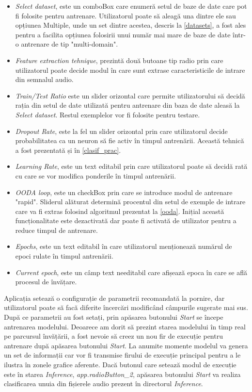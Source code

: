 \documentclass[a4paper,12pt]{book}
\begin{document}
		\begin{itemize}
			\setlength{\leftmargin}{-4cm}
			\item \textit{Select dataset}, este un comboBox care enumeră setul de baze de date care pot fi folosite pentru antrenare. Utilizatorul poate să aleagă una dintre ele sau opțiunea Multiple, unde un set dintre acestea, descris la \ref{datasets}, a fost ales pentru a facilita opțiunea folosirii unui număr mai mare de baze de date într-o antrenare de tip "multi-domain".
			\item \textit{Feature extraction tehnique}, prezintă două butoane tip radio prin care utilizatorul poate decide modul în care sunt extrase caracteristicile de intrare din semnalul audio. 
			\item \textit{Train/Test Ratio} este un slider orizontal care permite utilizatorului să decidă rația din setul de date utilizată pentru antrenare din baza de date aleasă la \textit{Select dataset}. Restul exemplelor vor fi folosite pentru testare. 
			\item \textit{Dropout Rate}, este la fel un slider orizontal prin care utilizatorul decide probabilitatea ca un neuron să fie activ în timpul antrenării. Această tehnică a fost prezentată și în \ref{clasif_prac}. 
			\item \textit{Learning Rate}, este un text editabil prin care utilizatorul poate să decidă rată cu care se vor modifica ponderile în timpul antrenării. 
			\item \textit{OODA loop}, este un checkBox prin care se introduce modul de antrenare "rapid". Sliderul alăturat determină procentul din setul de exemple de intrare care va fi extras folosind algoritmul prezentat la \ref{ooda}. Inițial această funcționalitate este dezactivată dar poate fi activată de utilizator pentru a reduce timpul de antrenare. 
			\item \textit{Epochs}, este un text editabil în care utilizatorul menționează numărul de epoci rulate în timpul antrenării.
			\item \textit{Current epoch}, este un câmp text needitabil care afișează epoca în care se află procesul de învățare.			
		\end{itemize}
		Aplicația setează o configurație de parametrii recomandată la pornire, dar utilizatorul poate să facă diferite încercări modificând câmpurile sugerate mai sus. După ce parametrii au fost setați, prin apăsarea butonului \textit{Start} se începe antrenarea modelului. Deoarece am dorit să prezint starea modelului în timp real pe parcursul învățării, a fost nevoie să creez un nou fir de execuție pentru antrenare după apăsarea butonului \textit{Start}. La anumite momente modelul va genera un set de informații car vor fi transmise firului de execuție principal pentru a le ilustra în zonele grafice aferente. Dacă butonul care setează modul de execuție este în starea \textit{Inference}, \textit{app.radioButton\_2}, apăsarea butonului \textit{Start} va realiza clasificarea unuia din fișierele audio prezent în directorul \textit{Inference}.
		
\end{document}
